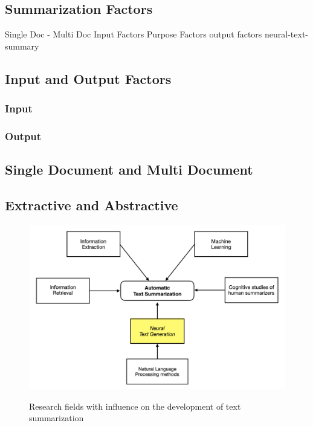 \subsection{Summarization Factors}

Single Doc - Multi Doc
Input Factors
Purpose Factors
output factors
neural-text-summary

\subsection{Input and Output Factors}
\subsubsection{Input}
\subsubsection{Output}
\subsection{Single Document and Multi Document}\label{ss:multidoc}
\subsection{Extractive and Abstractive}\label{ss:exabs}


\begin{figure}
	\begin{center}
		\includegraphics[width=5.5in]{photos/summ}\\
		\caption{Research fields with influence on the development of text summarization}\label{summ}
	\end{center}
\end{figure}

